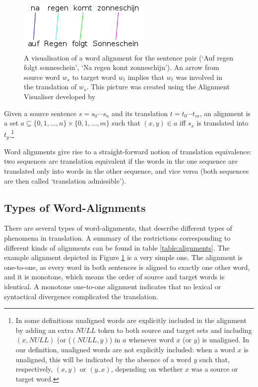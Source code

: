 \begin{figure}
\begin{framed}
\centering
\includegraphics[scale=0.6]{Graphics/alignment.png}
\caption{A visualisation of a word alignment for the sentence pair (`Auf regen folgt sonneschein', `Na regen komt zonneschijn'). An arrow from source word $w_s$ to target word $w_t$ implies that $w_t$ was involved in the translation of $w_s$. This picture was created using the Alignment Visualiser developed by \cite{maillette2010visualizing}}
\label{fig:alignment}
\end{framed}
\end{figure}

\begin{definition}\label{def:alignment}
Given a source sentence $s = s_0 \cdots s_n$ and its translation $t = t_0 \cdots t_m$, an alignment is a set $a \subseteq \{0,1,\ldots,n\} \times \{0,1,\ldots,m\}$ such that $(x,y)\in a$ iff $s_x$ is translated into $t_y$.\footnote{In some definitions unaligned words are explicitly included in the alignment by adding an extra $NULL$ token to both source and target sets and including $(x,NULL)$ (or ($(NULL,y)$) in $a$ whenever word $x$ (or $y$) is unaligned. In our definition, unaligned words are not explicitly included: when a word $x$ is unaligned, this will be indicated by the absence of a word $y$ such that, respectively, $(x,y)$ or $(y,x)$, depending on whether $x$ was a source or target word.}
\end{definition}

Word alignments give rise to a straight-forward notion of translation equivalence: two sequences are translation equivalent if the words in the one sequence are translated only into words in the other sequence, and vice versa (both sequences are then called `translation admissible'). 

\subsection{Types of Word-Alignments}
\label{subsec:types_alignments}

There are several types of word-alignments, that describe different types of phenomena in translation. A summary of the restrictions corresponding to different kinds of alignments can be found in table \ref{table:alignments}. The example alignment depicted in Figure \ref{fig:alignment} is a very simple one. The alignment is one-to-one, as every word in both sentences is aligned to exactly one other word, and it is monotone, which means the order of source and target words is identical. A monotone one-to-one alignment indicates that no lexical or syntactical divergence complicated the translation.

